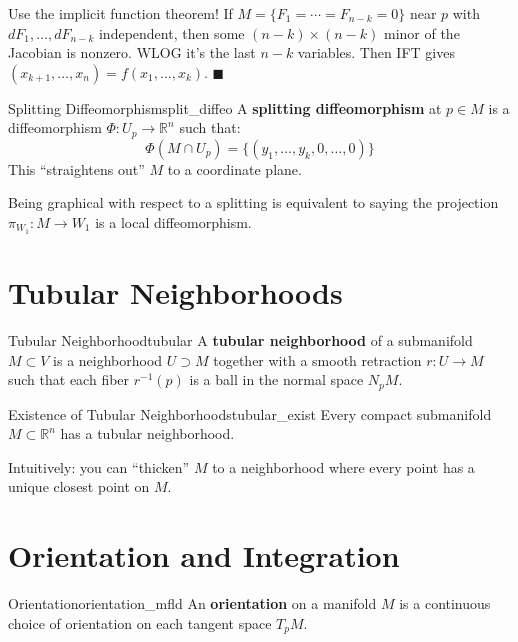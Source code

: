 \documentclass[11pt, letterpaper, openany]{book}
\renewenvironment{proof}[1][\proofname]{%
  \tcolorbox[blanker, breakable, left=1em,
    before skip=1em, after skip=1em,
    borderline west={2pt}{0pt}{MagicTeal!50},
    colback=MagicCream,
    before upper={\textcolor{MagicTeal}{\sffamily\bfseries #1.}\space}
  ]%
}{%
  \hfill\textcolor{MagicTeal}{\ensuremath{\blacksquare}}\endtcolorbox%
}
\begin{document}
\begin{proof}
Use the implicit function theorem! If $M = \{F_1 = \cdots = F_{n-k} = 0\}$ near $p$ with $dF_1, \ldots, dF_{n-k}$ independent, then some $(n-k) \times (n-k)$ minor of the Jacobian is nonzero. WLOG it's the last $n-k$ variables. Then IFT gives $(x_{k+1}, \ldots, x_n) = f(x_1, \ldots, x_k)$.
\end{proof}

\begin{defn}{Splitting Diffeomorphism}{split_diffeo}
A \textbf{splitting diffeomorphism} at $p \in M$ is a diffeomorphism $\Phi: U_p \to \mathbb{R}^n$ such that:
\[\Phi(M \cap U_p) = \{(y_1, \ldots, y_k, 0, \ldots, 0)\}\]
This ``straightens out'' $M$ to a coordinate plane.
\end{defn}

\begin{remark}
Being graphical with respect to a splitting is equivalent to saying the projection $\pi_{W_1}: M \to W_1$ is a local diffeomorphism.
\end{remark}

\section{Tubular Neighborhoods}

\begin{defn}{Tubular Neighborhood}{tubular}
A \textbf{tubular neighborhood} of a submanifold $M \subset V$ is a neighborhood $U \supset M$ together with a smooth retraction $r: U \to M$ such that each fiber $r^{-1}(p)$ is a ball in the normal space $N_p M$.
\end{defn}

\begin{thm}{Existence of Tubular Neighborhoods}{tubular_exist}
Every compact submanifold $M \subset \mathbb{R}^n$ has a tubular neighborhood.
\end{thm}

\begin{remark}
Intuitively: you can ``thicken'' $M$ to a neighborhood where every point has a unique closest point on $M$.
\end{remark}

\section{Orientation and Integration}

\begin{defn}{Orientation}{orientation_mfld}
An \textbf{orientation} on a manifold $M$ is a continuous choice of orientation on each tangent space $T_p M$.
\end{defn}
\end{document}
